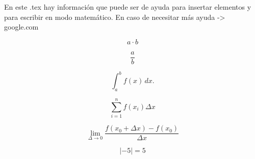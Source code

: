 En este .tex hay información que puede ser de ayuda para insertar elementos y para escribir en modo matemático. En caso de necesitar más ayuda -> google.com



%


\begin{equation*}
	a\cdot b
\end{equation*}

\begin{equation*}
	\frac{a}{b}
\end{equation*}

\begin{equation*}
	\int_a^b f(x)\, dx. 
\end{equation*}

\begin{equation*}
	\sum_{i=1}^n f(x_i) \Delta x
\end{equation*}

\begin{equation*}
	\lim_{\Delta \to 0} \frac{f(x_0+\Delta x)-f(x_0)}{\Delta x}
\end{equation*}

\begin{equation*}
	\lvert -5 \rvert=5
\end{equation*}

